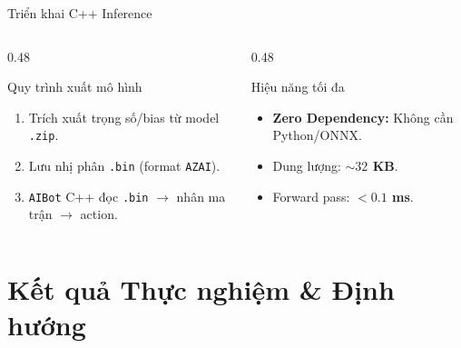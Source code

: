 \documentclass[aspectratio=169]{beamer}
\begin{document}
\begin{frame}{Triển khai C++ Inference}
  \begin{columns}[T]
    \begin{column}{0.48\textwidth}
      \begin{block}{Quy trình xuất mô hình}
        \small
        \begin{enumerate}
          \item Trích xuất trọng số/bias từ model \texttt{.zip}.
          \item Lưu nhị phân \texttt{.bin} (format \texttt{AZAI}).
          \item \texttt{AIBot} C++ đọc \texttt{.bin} $\to$ nhân ma trận $\to$ action.
        \end{enumerate}
      \end{block}
    \end{column}
    \begin{column}{0.48\textwidth}
      \begin{exampleblock}{Hiệu năng tối đa}
        \small
        \begin{itemize}
          \item \textbf{Zero Dependency:} Không cần Python/ONNX.
          \item Dung lượng: \textbf{$\sim 32$ KB}.
          \item Forward pass: \textbf{$<0.1$ ms}.
        \end{itemize}
      \end{exampleblock}
    \end{column}
  \end{columns}
\end{frame}

\section{Kết quả Thực nghiệm \& Định hướng}
\end{document}
